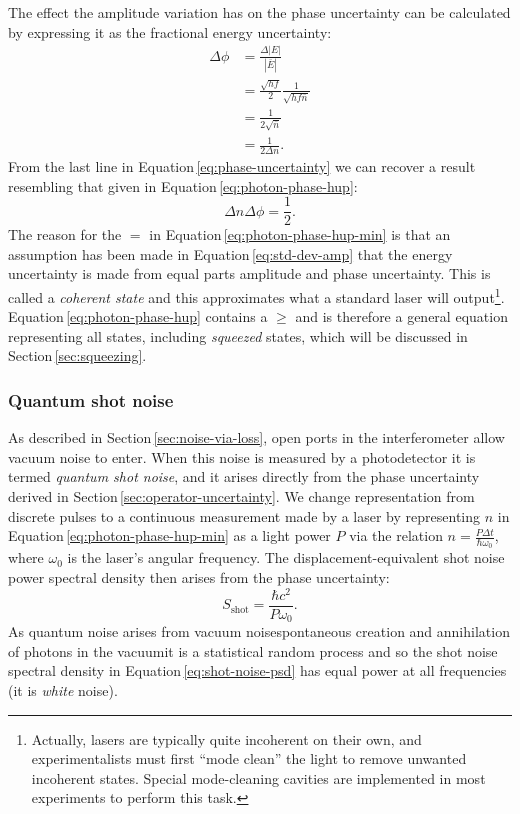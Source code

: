 The effect the amplitude variation has on the phase uncertainty can be calculated by expressing it as the fractional energy uncertainty:
\begin{equation}
  \label{eq:phase-uncertainty}
  \begin{split}
    \Delta \phi &= \frac{\Delta \left| E \right|}{\left| \bar{E} \right|} \\
                &= \frac{\sqrt{hf}}{2} \frac{1}{\sqrt{hf \bar{n}}} \\
                &= \frac{1}{2 \sqrt{\bar{n}}} \\
                &= \frac{1}{2 \Delta n}.
  \end{split}
\end{equation}
From the last line in Equation\,\ref{eq:phase-uncertainty} we can recover a result resembling that given in Equation\,\ref{eq:photon-phase-hup}:
\begin{equation}
  \label{eq:photon-phase-hup-min}
  \Delta n \Delta \phi = \frac{1}{2}.
\end{equation}
The reason for the $=$ in Equation\,\ref{eq:photon-phase-hup-min} is that an assumption has been made in Equation\,\ref{eq:std-dev-amp} that the energy uncertainty is made from equal parts amplitude and phase uncertainty. This is called a \emph{coherent state} and this approximates what a standard laser will output\footnote{Actually, lasers are typically quite incoherent on their own, and experimentalists must first ``mode clean'' the light to remove unwanted incoherent states. Special mode-cleaning cavities are implemented in most experiments to perform this task.}. Equation\,\ref{eq:photon-phase-hup} contains a $\geq$ and is therefore a general equation representing all states, including \emph{squeezed} states, which will be discussed in Section\,\ref{sec:squeezing}.

\subsubsection{\label{sec:quantum-shot-noise}Quantum shot noise}
As described in Section\,\ref{sec:noise-via-loss}, open ports in the interferometer allow vacuum noise to enter. When this noise is measured by a photodetector it is termed \emph{quantum shot noise}, and it arises directly from the phase uncertainty derived in Section\,\ref{sec:operator-uncertainty}. We change representation from discrete pulses to a continuous measurement made by a laser by representing $n$ in Equation\,\ref{eq:photon-phase-hup-min} as a light power $P$ via the relation $n = \frac{P \Delta t}{\hbar \omega_0}$, where $\omega_0$ is the laser's angular frequency. The displacement-equivalent shot noise power spectral density then arises from the phase uncertainty:
\begin{equation}
  \label{eq:shot-noise-psd}
  S_{\text{shot}} = \frac{\hbar c^2}{P \omega_0}.
\end{equation}
As quantum noise arises from vacuum noise\textemdash spontaneous creation and annihilation of photons in the vacuum\textemdash it is a statistical random process and so the shot noise spectral density in Equation\,\ref{eq:shot-noise-psd} has equal power at all frequencies (it is \emph{white} noise).

